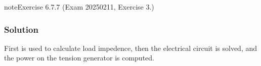 \documentclass[letterpaper,10pt,english]{jupyterBook}
\begin{document}
\begin{sphinxadmonition}{note}{Exercise 6.7.7 (Exam 2025\sphinxhyphen{}02\sphinxhyphen{}11, Exercise 3.)}



\begin{figure}[htbp]
\centering

\noindent{}
\end{figure}
\subsubsection*{Solution}

\sphinxAtStartPar
First {\hyperref[\detokenize{ch/electrical-engineering-networks-harmonic:classical-electromagnetism-electrical-engineering-newtork-analysis-harmonic-power}]{}} is used to calculate load impedence, then the electrical circuit is solved, and the power on the tension generator is computed.


\end{sphinxadmonition}
\end{document}
